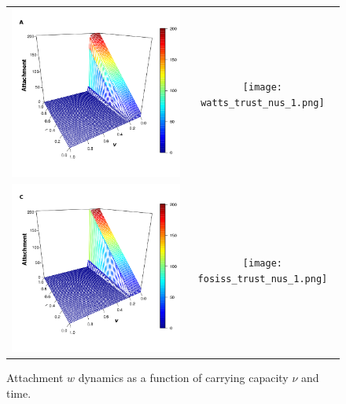 \documentclass[11pt]{article}
\begin{document}
\FloatBarrier


\begin{figure} [h!]
\centering
\begin{tabular}{cc}

\includegraphics[scale=0.28]{images/erdos_trust_nus_1.png} & \texttt{[image: watts\_trust\_nus\_1.png]} \\
\includegraphics[scale=0.28]{images/barabasi_trust_nus_1.png} & \texttt{[image: fosiss\_trust\_nus\_1.png]}
\end{tabular}
\caption{Attachment $w$ dynamics as a function of carrying capacity $\nu$ and time.}\label{trust}
\end{figure}
\end{document}
